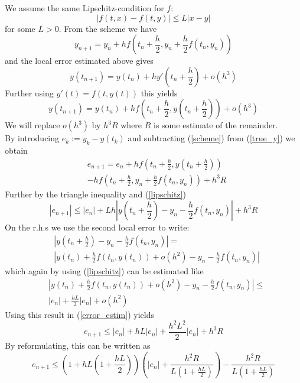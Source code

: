 \documentclass[17pt]{extarticle}
\begin{document}
	We assume the same Lipschitz-condition for $f$:
	\begin{equation} \label{lipschitz}
		|f(t, x)-f(t,y)|\leq L|x-y|
	\end{equation}
	for some $L>0$.
	From the scheme we have
	\begin{equation} \label{scheme}
		y_{n+1}=y_n+hf\left(t_n+\frac{h}{2}, y_n+\frac{h}{2}f(t_n, y_n)\right)
	\end{equation}
	and the local error estimated above gives
	\begin{equation*} 
		y(t_{n+1})=y(t_n)+hy'\left(t_n+\frac{h}{2}\right)+o(h^3)
	\end{equation*}	
	Further using $y'(t)=f(t,y(t))$ this yields
	\begin{equation} \label{true_y}
			y(t_{n+1})=y(t_n)+hf\left(t_n+\frac{h}{2}, y\left(t_n+\frac{h}{2}\right)\right)+o(h^3)
	\end{equation}
	We will replace $o(h^3)$ by $h^3R$ where $R$ is some estimate of the remainder.\\
	By introducing $e_k:=y_{k}-y(t_k)$ and subtracting (\ref{scheme}) from (\ref{true_y}) we obtain
	\begin{align*}
	&e_{n+1}=e_n+hf\left(t_n+\frac{h}{2}, y\left(t_n+\frac{h}{2}\right)\right)\\
	&-hf\left(t_n+\frac{h}{2}, y_n+\frac{h}{2}f(t_n, y_n)\right) +h^3R
	\end{align*}
	 Further by the triangle inequality and (\ref{lipschitz})
	\begin{equation} \label{error_estim}
	|e_{n+1}|\leq |e_n|+Lh\left|y\left(t_n+\frac{h}{2}\right)-y_n-\frac{h}{2}f(t_n, y_n)\right|+h^3R
	\end{equation}
	On the r.h.s we use the second local error to write:
	\begin{align*}
	&\left|y\left(t_n+\frac{h}{2}\right)-y_n-\frac{h}{2}f(t_n, y_n)\right|=\\
	&\left|y(t_n)+\frac{h}{2}f(t_n, y(t_n))+o(h^2)-y_n -\frac{h}{2}f(t_n, y_n)\right|
	\end{align*}
	which again by using (\ref{lipschitz}) can be estimated like
	\begin{align*}
	&\left|y(t_n)+\frac{h}{2}f(t_n, y(t_n))+o(h^2)-y_n -\frac{h}{2}f(t_n, y_n)\right|\leq \\
	&|e_n|+\frac{hL}{2}|e_n|+o(h^2)
	\end{align*}
	Using this result in (\ref{error_estim}) yields
	$$
	e_{n+1}\leq |e_n|+hL|e_n|+\frac{h^2L^2}{2}|e_n|+h^3R
	$$	
	By reformulating, this can be written as
	$$
	e_{n+1}\leq \left(1+hL\left(1+\frac{hL}{2}\right)\right)\left(|e_n|+\frac{h^2R}{L\left(1+\frac{hL}{2}\right)}\right)-\frac{h^2R}{L\left(1+\frac{hL}{2}\right)}
	$$	
\end{document}
